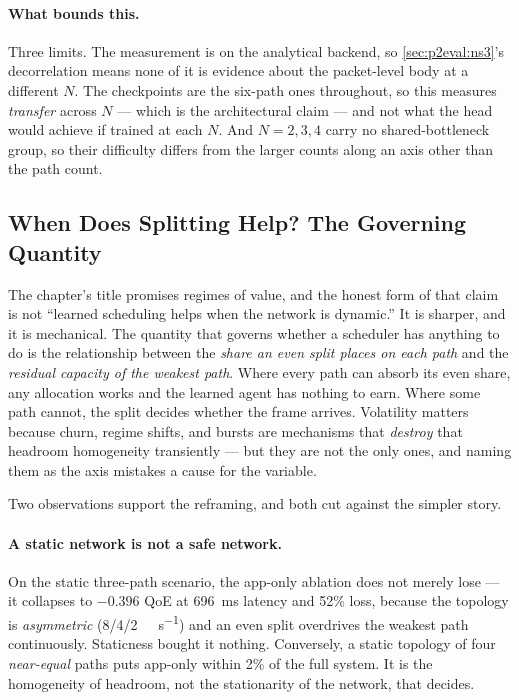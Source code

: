 \paragraph{What bounds this.} Three limits. The measurement is on the analytical backend, so
\cref{sec:p2eval:ns3}'s decorrelation means none of it is evidence about the packet-level body at a
different $N$. The checkpoints are the six-path ones throughout, so this measures \emph{transfer} across
$N$ --- which is the architectural claim --- and not what the head would achieve if trained at each $N$.
And $N = 2, 3, 4$ carry no shared-bottleneck group, so their difficulty differs from the larger counts
along an axis other than the path count.

\subsection{When Does Splitting Help? The Governing Quantity}
\label{sec:p2eval:regimes}

The chapter's title promises regimes of value, and the honest form of that claim is not ``learned
scheduling helps when the network is dynamic.'' It is sharper, and it is mechanical. The quantity that
governs whether a scheduler has anything to do is the relationship between the \emph{share an even
split places on each path} and the \emph{residual capacity of the weakest path}. Where every path can
absorb its even share, any allocation works and the learned agent has nothing to earn. Where some path
cannot, the split decides whether the frame arrives. Volatility matters because churn, regime shifts,
and bursts are mechanisms that \emph{destroy} that headroom homogeneity transiently --- but they are not
the only ones, and naming them as the axis mistakes a cause for the variable.

Two observations support the reframing, and both cut against the simpler story.

\paragraph{A static network is not a safe network.} On the static three-path scenario, the app-only
ablation does not merely lose --- it collapses to $-0.396$ QoE at \SI{696}{\milli\second} latency and
52\% loss, because the topology is \emph{asymmetric} (8/4/\SI{2}{\mega\bit\per\second}) and an even
split overdrives the weakest path continuously. Staticness bought it nothing. Conversely, a static
topology of four \emph{near-equal} paths puts app-only within 2\% of the full system. It is the
homogeneity of headroom, not the stationarity of the network, that decides.

